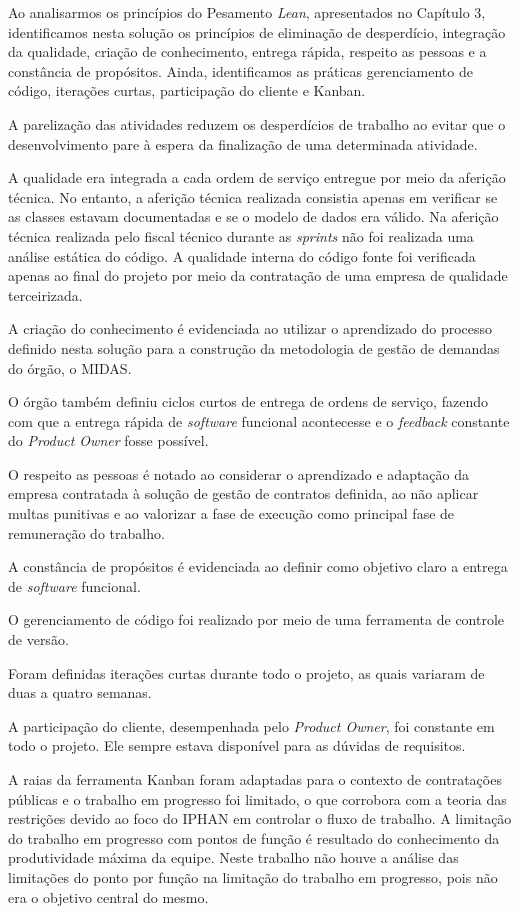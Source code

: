 Ao analisarmos os princípios do Pesamento \textit{Lean}, apresentados no Capítulo 3, identificamos nesta solução os princípios de eliminação de desperdício, integração da qualidade, criação de conhecimento, entrega rápida, respeito as pessoas e a constância de propósitos. Ainda, identificamos as práticas gerenciamento de código, iterações curtas, participação do cliente e Kanban.

A parelização das atividades reduzem os desperdícios de trabalho ao evitar que o desenvolvimento pare à espera da finalização de uma determinada atividade. 

A qualidade era integrada a cada ordem de serviço entregue por meio da aferição técnica. No entanto, a aferição técnica realizada consistia apenas em verificar se as classes estavam documentadas e se o modelo de dados era válido. Na aferição técnica realizada pelo fiscal técnico durante as \textit{sprints} não foi realizada uma análise estática do código. A qualidade interna do código fonte foi verificada apenas ao final do projeto por meio da contratação de uma empresa de qualidade terceirizada.

A criação do conhecimento é evidenciada ao utilizar o aprendizado do processo definido nesta solução para a construção da metodologia de gestão de demandas do órgão, o MIDAS.

O órgão também definiu ciclos curtos de entrega de ordens de serviço, fazendo com que a entrega rápida de \textit{software} funcional acontecesse e o \textit{feedback} constante do \textit{Product Owner} fosse possível. 

O respeito as pessoas é notado ao considerar o aprendizado e adaptação da empresa contratada à solução de gestão de contratos definida, ao não aplicar multas punitivas e ao valorizar a fase de execução como principal fase de remuneração do trabalho. 

A constância de propósitos é evidenciada ao definir como objetivo claro a entrega de \textit{software} funcional.

O gerenciamento de código foi realizado por meio de uma ferramenta de controle de versão.

Foram definidas iterações curtas durante todo o projeto, as quais variaram de duas a quatro semanas.

A participação do cliente, desempenhada pelo \textit{Product Owner}, foi constante em todo o projeto. Ele sempre estava disponível para as dúvidas de requisitos.

A raias da ferramenta Kanban foram adaptadas para o contexto de contratações públicas e o trabalho em progresso foi limitado, o que corrobora com a teoria das restrições devido ao foco do IPHAN em controlar o fluxo de trabalho. A limitação do trabalho em progresso com pontos de função é resultado do conhecimento da produtividade máxima da equipe. Neste trabalho não houve a análise das limitações do ponto por função na limitação do trabalho em progresso, pois não era o objetivo central do mesmo.  

